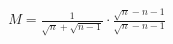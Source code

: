 \documentclass[preview]{standalone}
\begin{document}
\begin{align*}
M = \frac{1}{\sqrt{n} + \sqrt{n - 1}} \cdot \frac{\sqrt{n} - {n - 1}}{\sqrt{n} - {n - 1}}
\end{align*}
\end{document}
